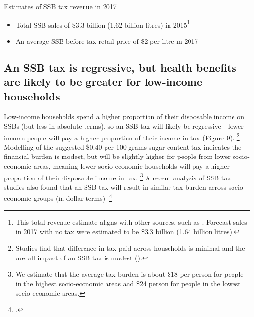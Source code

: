 \documentclass[embargoed]{grattan}
\begin{document}
\begin{table}
\caption{Estimates of SSB tax revenue in 2017}




\end{table}

\begin{itemize}
\item
  Total SSB sales of \$3.3 billion (1.62 billion litres) in 2015\footnote{This total revenue estimate aligns with other sources, such as \textcite{Levy2014QuenchingAustraliasthirst}.
Forecast sales in 2017 with no tax were estimated to be \$3.3 billion (1.64 billion litres).}
\item
  An average SSB before tax retail price of \$2 per litre in 2017
\end{itemize}

\subsection{An SSB tax is regressive, but health benefits are likely to be greater for low-income households}\label{an-ssb-tax-is-regressive-but-health-benefits-are-likely-to-be-greater-for-low-income-households}

Low-income households spend a higher proportion of their disposable income on SSBs (but less in absolute terms), so an SSB tax will likely be regressive - lower income people will pay a higher proportion of their income in tax (Figure 9).%
\footnote{Studies find that difference in tax paid across households is minimal and the overall impact of an SSB tax is modest (\textcites{Backholer2014effectsugarsweetened}{Etile2015DoHighConsumers}).} Modelling of the suggested \$0.40 per 100 grams sugar content tax indicates the financial burden is modest, but will be slightly higher for people from lower socio-economic areas, meaning lower socio-economic households will pay a higher proportion of their disposable income in tax.%
\footnote{We estimate that the average tax burden is about \$18 per person for people in the highest socio-economic areas and \$24 person for people in the lowest socio-economic areas.} A recent analysis of SSB tax studies also found that an SSB tax will result in similar tax burden across socio-economic groups (in dollar terms).%
\footcite{Backholer2016impacttaxsugar}
\end{document}
